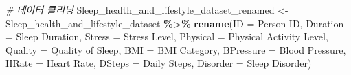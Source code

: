 \documentclass[
  11pt,
]{article}
\newenvironment{Shaded}{\begin{snugshade}}{\end{snugshade}}
\newcommand{\AttributeTok}[1]{\textcolor[rgb]{0.13,0.29,0.53}{#1}}
\newcommand{\CommentTok}[1]{\textcolor[rgb]{0.56,0.35,0.01}{\textit{#1}}}
\newcommand{\FunctionTok}[1]{\textcolor[rgb]{0.13,0.29,0.53}{\textbf{#1}}}
\newcommand{\NormalTok}[1]{#1}
\newcommand{\OtherTok}[1]{\textcolor[rgb]{0.56,0.35,0.01}{#1}}
\newcommand{\SpecialCharTok}[1]{\textcolor[rgb]{0.81,0.36,0.00}{\textbf{#1}}}
\newcommand{\StringTok}[1]{\textcolor[rgb]{0.31,0.60,0.02}{#1}}
\begin{document}
\begin{Shaded}
\begin{Highlighting}[]
\CommentTok{\# 데이터 클리닝}
\NormalTok{Sleep\_health\_and\_lifestyle\_dataset\_renamed }\OtherTok{\textless{}{-}}\NormalTok{ Sleep\_health\_and\_lifestyle\_dataset }\SpecialCharTok{\%\textgreater{}\%}
  \FunctionTok{rename}\NormalTok{(}\AttributeTok{ID =} \StringTok{\textquotesingle{}Person ID\textquotesingle{}}\NormalTok{,}
         \AttributeTok{Duration =} \StringTok{\textquotesingle{}Sleep Duration\textquotesingle{}}\NormalTok{,}
         \AttributeTok{Stress =} \StringTok{\textquotesingle{}Stress Level\textquotesingle{}}\NormalTok{,}
         \AttributeTok{Physical =} \StringTok{\textquotesingle{}Physical Activity Level\textquotesingle{}}\NormalTok{,}
         \AttributeTok{Quality =} \StringTok{\textquotesingle{}Quality of Sleep\textquotesingle{}}\NormalTok{,}
         \AttributeTok{BMI =} \StringTok{\textquotesingle{}BMI Category\textquotesingle{}}\NormalTok{,}
         \AttributeTok{BPressure =} \StringTok{\textquotesingle{}Blood Pressure\textquotesingle{}}\NormalTok{,}
         \AttributeTok{HRate =} \StringTok{\textquotesingle{}Heart Rate\textquotesingle{}}\NormalTok{,}
         \AttributeTok{DSteps =} \StringTok{\textquotesingle{}Daily Steps\textquotesingle{}}\NormalTok{,}
         \AttributeTok{Disorder =} \StringTok{\textquotesingle{}Sleep Disorder\textquotesingle{}}\NormalTok{)}
\end{Highlighting}
\end{Shaded}
\end{document}

